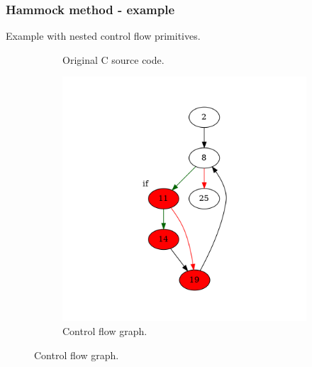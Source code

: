 \documentclass[aspectratio=1610]{beamer}
\begin{document}
\begin{frame}[noframenumbering]
	\frametitle{Hammock method - example}
	Example with nested control flow primitives.
	\begin{figure}[htbp]
		\centering
		\begin{subfigure}[b]{0.30\textwidth}
			\centering
			
			\caption{Original C source code.}
		\end{subfigure}
		\begin{subfigure}[b]{0.50\textwidth}
			\centering
			\includegraphics[height=0.6\paperheight]{inc/methods/hammock/example/without-break/main_0002a.png}
			\caption{Control flow graph.}
		\end{subfigure}
	\end{figure}
\end{frame}
\end{document}
